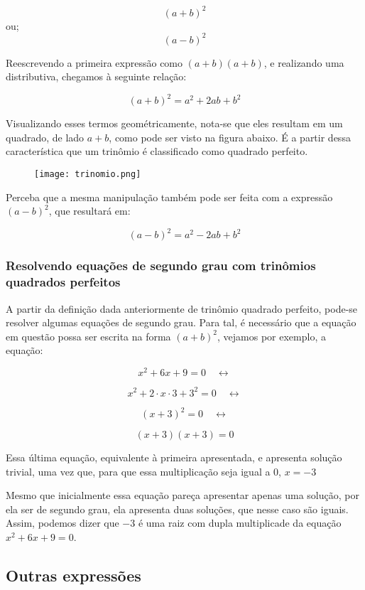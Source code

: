 \documentclass[../resumo.tex]{subfiles}
\begin{document}
	\[(a + b)^2\]
	ou;
	\[(a - b)^2\]

	Reescrevendo a primeira expressão como \((a + b)(a + b)\), e realizando uma distributiva, chegamos
	à seguinte relação:

	\[(a + b)^2 = a^2 + 2ab + b^2\]
	

	Visualizando esses termos geométricamente, nota-se que eles resultam em um quadrado,
	de lado \(a + b\), como pode ser visto na figura abaixo. É a partir dessa característica
	que um trinômio é classificado como quadrado perfeito.

	\begin{figure}[H]
		\centering
		\texttt{[image: trinomio.png]}
		\label{fig: Visualização geométrica do trinômio quadrado perfeito}
	\end{figure}

	Perceba que a mesma manipulação também pode ser feita com a expressão \((a - b)^2\), que resultará em:

	\[(a - b)^2 = a^2 - 2ab + b^2\]


	\subsubsection{Resolvendo equações de segundo grau com trinômios quadrados perfeitos}

	A partir da definição dada anteriormente de trinômio quadrado perfeito, pode-se resolver
	algumas equações de segundo grau. Para tal, é necessário que a equação em questão possa ser escrita
	na forma \((a + b)^2\), vejamos por exemplo, a equação:
	
	\[x^2 + 6x + 9 = 0 \quad \leftrightarrow\]

	\[x^2 + 2\cdot x\cdot3 + 3^2 = 0 \quad \leftrightarrow\]

	\[(x + 3)^2 = 0 \quad \leftrightarrow\]

	\[(x + 3)(x + 3) = 0\]

	Essa última equação, equivalente à primeira apresentada, e apresenta solução trivial, uma vez que, para que
	essa multiplicação seja igual a 0, \(x = -3\)

	Mesmo que inicialmente essa equação pareça apresentar apenas uma solução,
	por ela ser de segundo grau, ela apresenta duas soluções, que nesse caso são iguais. Assim, podemos dizer
	que $-3$ é uma raiz com dupla multiplicade da equação \(x^2 + 6x + 9 = 0\).

	\subsection{Outras expressões}
\end{document}
